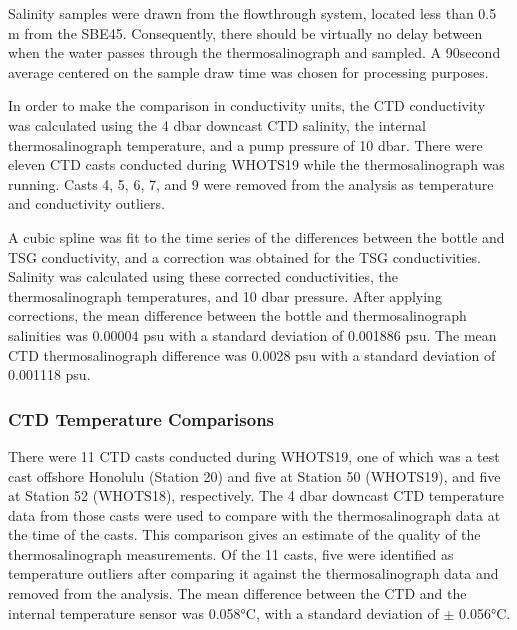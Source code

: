 \documentclass[a4paper,10pt,english,openany,oneside]{sphinxmanual}
\begin{document}
\sphinxAtStartPar
Salinity samples were drawn from the flow\sphinxhyphen{}through system, located less than 0.5
m from the SBE\sphinxhyphen{}45. Consequently, there should be virtually no delay between
when the water passes through the thermosalinograph and sampled. A 90\sphinxhyphen{}second
average centered on the sample draw time was chosen for processing purposes.

\sphinxAtStartPar
In order to make the comparison in conductivity units, the CTD conductivity was
calculated using the 4 dbar downcast CTD salinity, the internal
thermosalinograph temperature, and a pump pressure of 10 dbar. There were
eleven CTD casts conducted during WHOTS\sphinxhyphen{}19 while the thermosalinograph was
running. Casts 4, 5, 6, 7, and 9 were removed from the analysis as temperature
and conductivity outliers.

\sphinxAtStartPar
A cubic spline was fit to the time series of the differences between the bottle
and TSG conductivity, and a correction was obtained for the TSG conductivities.
Salinity was calculated using these corrected conductivities, the
thermosalinograph temperatures, and 10 dbar pressure. After applying
corrections, the mean difference between the bottle and thermosalinograph
salinities was \sphinxhyphen{}0.00004 psu with a standard deviation of 0.001886 psu. The mean
CTD \sphinxhyphen{} thermosalinograph difference was \sphinxhyphen{}0.0028 psu with a standard deviation of
0.001118 psu.


\subsubsection{CTD Temperature Comparisons}
\label{\detokenize{4_section:ctd-temperature-comparisons}}
\sphinxAtStartPar
There were 11 CTD casts conducted during WHOTS\sphinxhyphen{}19, one of which was a test cast
offshore Honolulu (Station 20) and five at Station 50 (WHOTS\sphinxhyphen{}19), and five at
Station 52 (WHOTS\sphinxhyphen{}18), respectively.
The 4 dbar downcast CTD temperature data from those casts were used to compare
with the thermosalinograph data at the time of the casts. This comparison gives
an estimate of the quality of the thermosalinograph measurements. Of the 11
casts, five were identified as temperature outliers after comparing it against
the thermosalinograph data and removed from the analysis. The mean difference
between the CTD and the internal temperature sensor was 0.058°C, with a
standard deviation of \(\pm\) 0.056°C.
\end{document}
